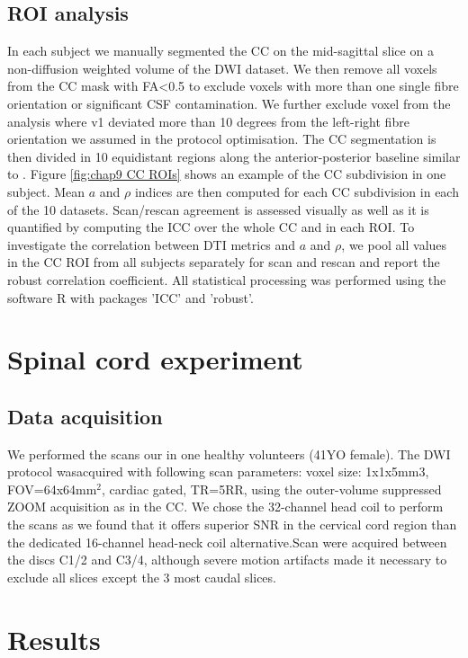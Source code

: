 \subsection{ROI analysis} 
In each subject we manually segmented the CC on the mid-sagittal slice on a non-diffusion weighted volume of the \gls{DWI} dataset. We then remove all voxels from the CC mask with FA<0.5 to exclude voxels with more than one single fibre orientation or significant CSF contamination. We further exclude voxel from the analysis where v1 deviated more than 10 degrees from the left-right fibre orientation we assumed in the protocol optimisation. The CC segmentation is then divided in 10 equidistant regions along the anterior-posterior baseline similar to \cite{Aboitiz:1992}. Figure \ref{fig:chap9 CC ROIs} shows an example of the CC subdivision in one subject. Mean $a$ and $\rho$ indices are then computed for each CC subdivision in each of the 10 datasets. Scan/rescan agreement is assessed visually as well as it is quantified by computing the \gls{ICC} \citep{Shrout:1979} over the whole CC and in each \gls{ROI}. To investigate the correlation between DTI metrics and $a$ and $\rho$, we pool all values in the CC ROI from all subjects separately for scan and rescan and report the robust correlation coefficient\citep{Huber:1996}. All statistical processing was performed using the software R\citep{RCoreTeam:2012} with packages 'ICC'\citep{Wolak:2011} and 'robust'\citep{Wang:2012}.

\section{Spinal cord experiment}
\subsection{Data acquisition}
We performed the scans  our \SFasym{} in one healthy volunteers (41YO female). The \SF{} DWI protocol wasacquired with following scan parameters: voxel size: 1x1x5mm3, FOV=64x64mm$^2$, cardiac gated, TR=5RR, using the outer-volume suppressed ZOOM acquisition \citep{Wilm:2007} as in the CC. We chose the 32-channel head coil to perform the scans as we found that it offers superior SNR in the cervical cord region than the dedicated 16-channel head-neck coil alternative.Scan were acquired between the discs C1/2 and C3/4, although severe motion artifacts made it necessary to exclude all slices except the 3 most caudal slices. 

\FloatBarrier
\section{Results}
